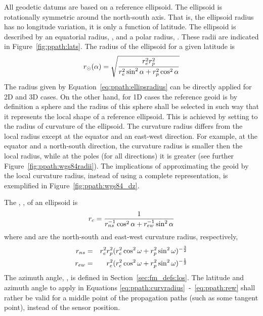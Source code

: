 All geodetic datums are based on a reference ellipsoid. The ellipsoid is rotationally symmetric around the
north-south axis. That is, the ellipsoid radius has no longitude
variation, it is only a function of latitude. The ellipsoid is
described by an equatorial radius, , and a polar radius,
. These radii are indicated in Figure~\ref{fig:ppath:lats}.
The radius of the ellipsoid for a given latitude is
\begin{equation}
 r_{\odot}(\alpha) = \sqrt{\frac{r_{e}^2r_{p}^2}
                    {r_{e}^2\sin^2\alpha+r_{p}^2\cos^2\alpha}}
 \label{eq:ppath:ellipsradius} 
\end{equation}
The radius given by Equation~\ref{eq:ppath:ellipsradius} can be
directly applied for 2D and 3D cases. On the other hand, for 1D cases
the reference geoid is by definition a sphere and the radius of this
sphere shall be selected in such way that it represents the local
shape of a reference ellipsoid. This is achieved by setting
\aRds{\odot} to the radius of curvature of the ellipsoid. The
curvature radius differs from the local radius except at the equator
and an east-west direction. For example, at the equator and a
north-south direction, the curvature radius is smaller then the local
radius, while at the poles (for all directions) it is greater (see
further Figure~\ref{fig:ppath:wgs84radii}). The implications of
approximating the geoid by the local curvature radius, instead of
using a complete representation, is exemplified in
Figure~\ref{fig:ppath:wgs84_dz}.

The , , of an ellipsoid is 
\citep{rodgers:00}
\begin{equation}
 r_{c} = \frac{1}{r_{ns}^{-1}\cos^2 \alpha + r_{ew}^{-1}\sin^2 \alpha}
 \label{eq:ppath:curvradius} 
\end{equation}
where  and  are the north-south and east-west curvature radius, respectively,
\begin{eqnarray}
 r_{ns} &=& r_{e}^2r_{p}^2 (
           r_{e}^2\cos^2\omega+r_{p}^2\sin^2\omega )^{-\frac{3}{2}} \\
 r_{ew} &=& r_{e}^2 (
           r_{e}^2\cos^2\omega+r_{p}^2\sin^2\omega )^{-\frac{1}{2}} 
 \label{eq:ppath:rew} 
\end{eqnarray}
The azimuth angle, \AzmAng, is defined in
Section~\ref{sec:fm_defs:los}. The latitude and azimuth angle to
apply in Equations \ref{eq:ppath:curvradius}~-~\ref{eq:ppath:rew}
shall rather be valid for a middle point of the propagation paths
(such as some tangent point), instead of the sensor position. 

